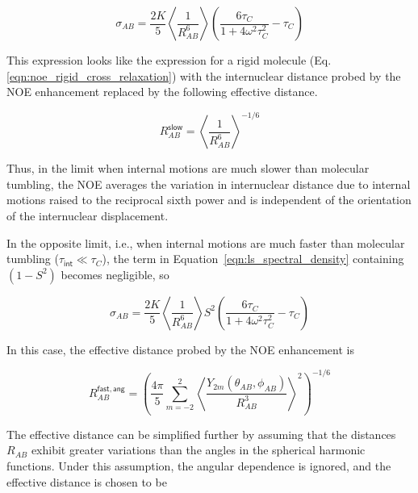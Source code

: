 \documentclass[9pt,review,pubversion]{livecoms}
\begin{document}
\begin{equation}
\label{eqn:ls_slow_cross_relaxation}
\sigma_{AB} = \frac {2 K} {5} \left \langle \frac {1} {R_{AB}^6} \right \rangle \left( \frac {6 \tau_C} {1 + 4 \omega^2 \tau_C^2} - \tau_C \right)
\end{equation}

\noindent This expression looks like the expression for a rigid molecule (Eq. \ref{eqn:noe_rigid_cross_relaxation}) with the internuclear distance probed by the NOE enhancement replaced by the following effective distance.

\begin{equation}
\label{eqn:ls_slow_effective_distance}
R_{AB}^{\mathsf{slow}} = \left \langle \frac {1} {R_{AB}^6} \right \rangle^{-1/6}
\end{equation}

\noindent Thus, in the limit when internal motions are much slower than molecular tumbling, the NOE averages the variation in internuclear distance due to internal motions raised to the reciprocal sixth power and is independent of the orientation of the internuclear displacement.

In the opposite limit, i.e.,  when internal motions are much faster than molecular tumbling ($\tau_{\mathsf{int}} \ll \tau_C$), the term in Equation~\ref{eqn:ls_spectral_density} containing $(1 - S^2)$ becomes negligible, so

\begin{equation}
\label{eqn:ls_fast_cross_relaxation}
\sigma_{AB} = \frac {2 K} {5} \left \langle \frac {1} {R_{AB}^6} \right \rangle S^2 \left( \frac {6 \tau_C} {1 + 4 \omega^2 \tau_C^2} - \tau_C \right)
\end{equation}

\noindent In this case, the effective distance probed by the NOE enhancement is

\begin{equation}
\label{eqn:ls_fast_effective_distance_angular}
R_{AB}^{\mathsf{fast,ang}} = \left( \frac {4 \pi} {5} \sum_{m=-2}^2 \left \langle \frac {Y_{2m}(\theta_{AB}, \phi_{AB})} {R_{AB}^3} \right \rangle^2 \right)^{-1/6}
\end{equation}

\noindent The effective distance can be simplified further by assuming that the distances $R_{AB}$ exhibit greater variations than the angles in the spherical harmonic functions.
Under this assumption, the angular dependence is ignored, and the effective distance is chosen to be
\end{document}
